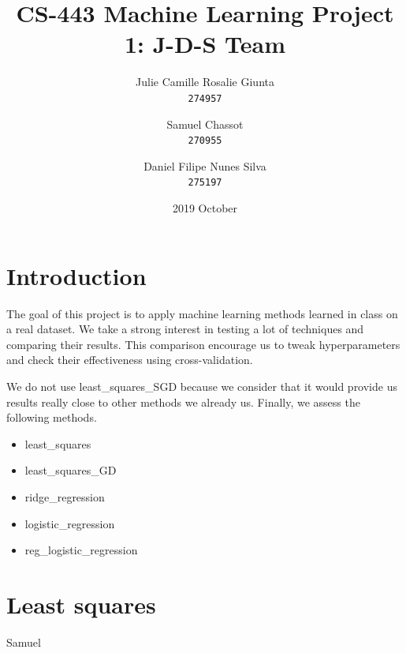 \documentclass[11pt, a4paper, twoside]{article}
\begin{document}
\date{2019 October}
\title{CS-443 Machine Learning Project 1: J-D-S Team}
\author{
  Julie Camille Rosalie Giunta\\
  \texttt{274957}
  \and
  Samuel Chassot\\
  \texttt{270955}
  \and
  Daniel Filipe Nunes Silva\\
  \texttt{275197}
}

\maketitle
\clearpage

\section{Introduction}
The goal of this project is to apply machine learning
methods learned in class on a real dataset. We take a
strong interest in testing a lot of techniques and
comparing their results. This comparison encourage us to
tweak hyperparameters and check their effectiveness using
cross-validation.

We do not use least\_squares\_SGD because we consider
that it would provide us results really close to other
methods we already us. Finally, we assess the following
methods.

\begin{itemize}
  \item least\_squares
  \item least\_squares\_GD 
  \item ridge\_regression
  \item logistic\_regression
  \item reg\_logistic\_regression
\end{itemize}
 
\section{Least squares}
Samuel
\end{document}
